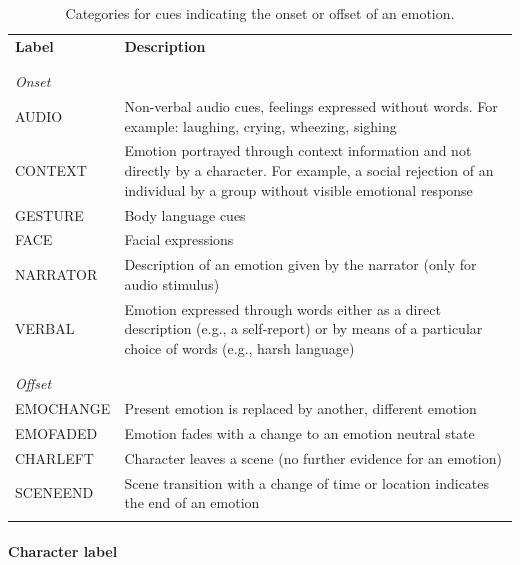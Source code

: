 \documentclass[10pt,a4paper,twocolumn]{article}
\begin{document}
\begin{table}
  \centering
  \begin{tabular}{lp{10cm}}
    \textbf{Label} & \textbf{Description} \\
    \\\hline\\
    \textit{Onset}\\
    AUDIO & Non-verbal audio cues, feelings expressed without words. For example: laughing, crying, wheezing, sighing\\
    CONTEXT & Emotion portrayed through context information and not directly by a character. For example, a social rejection of an individual by a group without visible emotional response\\
    GESTURE & Body language cues \\
    FACE & Facial expressions \\
    NARRATOR & Description of an emotion given by the narrator (only for audio stimulus)\\
    VERBAL & Emotion expressed through words either as a direct description (e.g., a self-report) or by means of a particular choice of words (e.g., harsh language)\\
    \\\hline\\
    \textit{Offset}\\
    EMOCHANGE & Present emotion is replaced by another, different emotion \\
    EMOFADED & Emotion fades with a change to an emotion neutral state \\
    CHARLEFT & Character leaves a scene (no further evidence for an emotion)\\
    SCENEEND & Scene transition with a change of time or location indicates the end of an emotion\\
    \\\hline

  \end{tabular}
  \caption{Categories for cues indicating the onset or offset of an emotion.}
  \label{tab:onoffset_indicators}
\end{table}



\paragraph{Character label}
\end{document}
